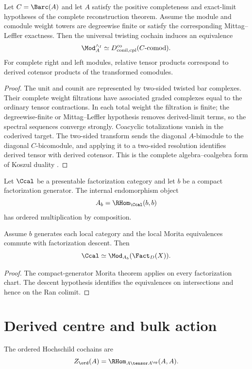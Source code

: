 \begin{theorem}
Let $C=\Barc(A)$ and let $A$ satisfy the positive completeness and exact-limit hypotheses of the complete reconstruction theorem. Assume the module and comodule weight towers are degreewise finite or satisfy the corresponding Mittag--Leffler exactness. Then the universal twisting cochain induces an equivalence
\[
 \Mod_A^{\wedge_I}
 \simeq
 D^{\mathrm{co}}_{\mathrm{conil,cpl}}(C\text{-}\mathrm{comod}).
\]
For complete right and left modules, relative tensor products correspond to derived cotensor products of the transformed comodules.
\end{theorem}
\begin{proof}
The unit and counit are represented by two-sided twisted bar complexes. Their complete weight filtrations have associated graded complexes equal to the ordinary tensor contractions. In each total weight the filtration is finite; the degreewise-finite or Mittag--Leffler hypothesis removes derived-limit terms, so the spectral sequences converge strongly. Coacyclic totalizations vanish in the coderived target. The two-sided transform sends the diagonal $A$-bimodule to the diagonal $C$-bicomodule, and applying it to a two-sided resolution identifies derived tensor with derived cotensor. This is the complete algebra--coalgebra form of Koszul duality \cite{Positselski,LurieHA}.
\end{proof}

Let $\Ccal$ be a presentable factorization category and let $b$ be a compact factorization generator. The internal endomorphism object
\[
 A_b=\RHom_{\Ccal}(b,b)
\]
has ordered multiplication by composition.

\begin{theorem}
Assume $b$ generates each local category and the local Morita equivalences commute with factorization descent. Then
\[
 \Ccal\simeq \Mod_{A_b}(\Fact_D(X)).
\]
\end{theorem}
\begin{proof}
The compact-generator Morita theorem applies on every factorization chart. The descent hypothesis identifies the equivalences on intersections and hence on the Ran colimit.
\end{proof}

\chapter{Derived centre and bulk action}
The ordered Hochschild cochains are
\[
 Z_{\ord}(A)=\RHom_{A\tensor A^{\op}}(A,A).
\]

